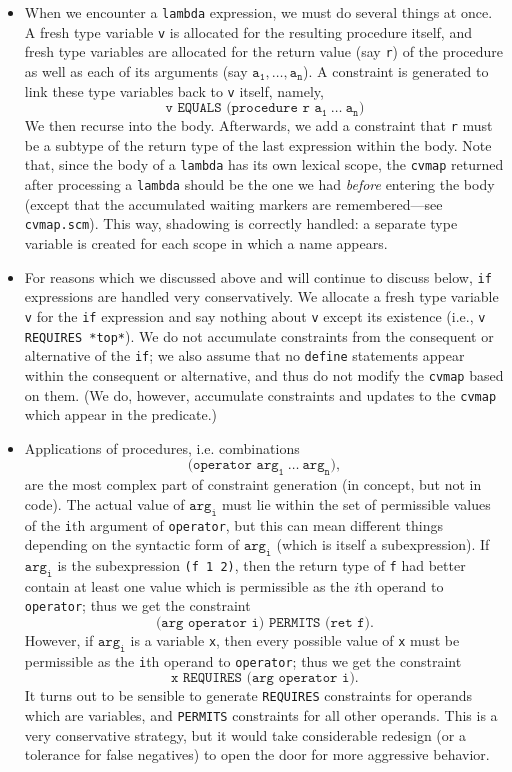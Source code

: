 \documentclass[a4paper]{article}
\newcommand{\T}[1]{\texttt{#1}}
\begin{document}
\begin{itemize}
  \item When we encounter a \T{lambda} expression, we must do several things at
    once.  A fresh type variable \T{v} is allocated for the resulting procedure
    itself, and fresh type variables are allocated for the return value (say
    \T{r}) of the procedure as well as each of its arguments (say $\mathtt{a_1,
    \ldots, a_n}$).  A constraint is generated to link these type variables back
    to \T{v} itself, namely,
    \[ \T{v EQUALS (procedure r }\mathtt{a_1\ \ldots\ a_n}\T{)} \]
    We then recurse into the body.  Afterwards, we add a constraint that \T{r}
    must be a subtype of the return type of the last expression within the body.
    Note that, since the body of a \T{lambda} has its own lexical scope, the
    \T{cvmap} returned after processing a \T{lambda} should be the one we had
    {\em before} entering the body (except that the accumulated waiting markers
    are remembered---see \T{cvmap.scm}).  This way, shadowing is correctly
    handled: a separate type variable is created for each scope in which a name
    appears.

  \item For reasons which we discussed above and will continue to discuss below,
    \T{if} expressions are handled very conservatively.  We allocate a fresh
    type variable \T{v} for the \T{if} expression and say nothing about \T{v}
    except its existence (i.e., \T{v REQUIRES *top*}).  We do not accumulate
    constraints from the consequent or alternative of the \T{if}; we also assume
    that no \T{define} statements appear within the consequent or alternative,
    and thus do not modify the \T{cvmap} based on them.  (We do, however,
    accumulate constraints and updates to the \T{cvmap} which appear in the
    predicate.)

  \item Applications of procedures, i.e. combinations
    \[ \T{(operator }\mathtt{arg_1\ \ldots\ arg_n}\T{)}, \]
    are the most complex part of constraint generation (in concept, but not in
    code).  The actual value of $\mathtt{arg_i}$ must lie within the set of
    permissible values of the \T{i}th argument of \T{operator}, but this can
    mean different things depending on the syntactic form of $\mathtt{arg_i}$
    (which is itself a subexpression).  If $\mathtt{arg_i}$ is the subexpression
    \T{(f 1 2)}, then the return type of \T{f} had better contain at least one
    value which is permissible as the $i$th operand to \T{operator}; thus we get
    the constraint
    \[ \T{(arg operator i) PERMITS (ret f)}. \]
    However, if $\mathtt{arg_i}$ is a variable \T{x}, then every possible value
    of \T{x} must be permissible as the \T{i}th operand to \T{operator}; thus we
    get the constraint
    \[ \T{x REQUIRES (arg operator i)}. \]
    It turns out to be sensible to generate \T{REQUIRES} constraints for
    operands which are variables, and \T{PERMITS} constraints for all other
    operands.  This is a very conservative strategy, but it would take
    considerable redesign (or a tolerance for false negatives) to open the door
    for more aggressive behavior.
\end{itemize}
\end{document}
